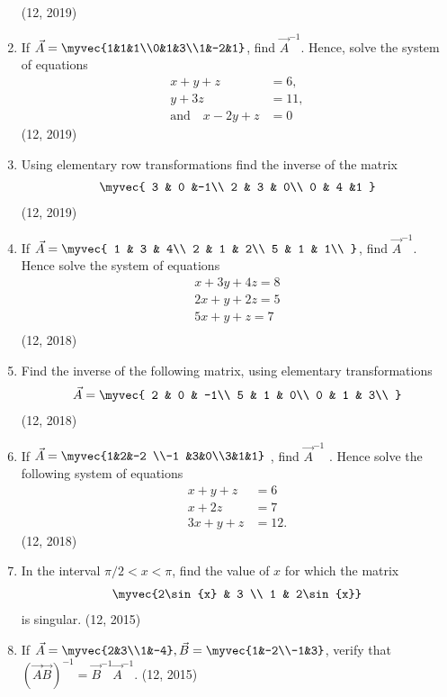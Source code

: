 \begin{enumerate}[label=\thesubsection.\arabic*,ref=\thesubsection.\theenumi]
\begin{align*}
\end{align*}
\hfill (12, 2019)
\item If $\vec{A} = \myvec{1&1&1\\0&1&3\\1&-2&1}$, find $\vec{A}^{-1}$.
Hence, solve the system of equations 
\begin{align*}
    x+y+z&=6 ,\\
    y+3z&=11 ,\\
    \text  {and} \hspace{12pt}x-2y+z&= 0
\end{align*}
\hfill (12, 2019)
\item Using elementary row transformations find the inverse of the matrix
\begin{align*}
	\myvec{
			3 & 0 &-1\\
			2 & 3 & 0\\
			0 & 4 &1
		}
\end{align*}
\hfill (12, 2019)
\item If $\vec{A}=\myvec{
    1 & 3 & 4\\
    2 & 1 & 2\\
    5 & 1 & 1\\
}$,
find  ${\vec{A}}^{-1}$. Hence solve the system of equations 
\begin{align*}
      {x + 3y + 4z = 8} \\
      {2x + y + 2z = 5}\\
    {5x + y + z = 7}\\
\end{align*}
\hfill (12, 2018)
\item Find the inverse of the following matrix, using elementary transformations
\begin{align*}
\vec{A}= \myvec{
    2 & 0 & -1\\
    5 & 1 & 0\\
    0 & 1 & 3\\
}
\end{align*}
\hfill (12, 2018)
  \item If $\vec{A}=\myvec {1&2&-2 \\-1 &3&0\\3&1&1}$ , find $\vec{A}^{-1}$ . Hence solve the following system of equations 
\begin{align*}
	x+y+z&= 6
	  \\
	  x+2z&=7
	  \\
	  3x+y+z&=12. 
\end{align*}
\hfill (12, 2018)
\item In the interval ${\pi}/2<x<\pi$, find the value of $x$ for which the matrix 
\begin{align*}
	\myvec{2\sin{x} & 3 \\ 1 & 2\sin{x}}
\end{align*}
 is singular.
\hfill (12, 2015)
\item If $\vec{A} = \myvec{2&3\\1&-4}, \vec{B} = \myvec{1&-2\\-1&3}$, verify that $(\vec{A}\vec{B})^{-1} = \vec{B}^{-1}\vec{A}^{-1}$. 
\hfill (12, 2015)


\end{enumerate}
